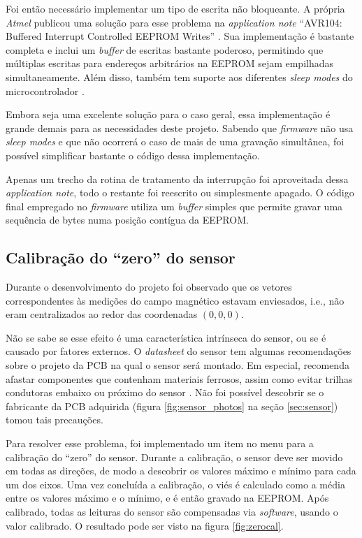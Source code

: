\documentclass[brazil,pagestart=firstchapter]{abnt}
\makeatletter
\newcommand*{\ie}{i.e.\@\xspace}
\makeatother
\begin{document}
Foi então necessário implementar um tipo de escrita não bloqueante.
A própria \textit{Atmel} publicou uma solução para esse problema na
\textit{application note} ``AVR104: Buffered Interrupt Controlled EEPROM
Writes'' \cite{AVR104}. Sua implementação é bastante completa e inclui um
\textit{buffer} de escritas bastante poderoso, permitindo que múltiplas
escritas para endereços arbitrários na \ac{EEPROM} sejam empilhadas
simultaneamente. Além disso, também tem suporte aos diferentes \textit{sleep
modes} do microcontrolador \cite{ATmega8}.

Embora seja uma excelente solução para o caso geral, essa implementação
é grande demais para as necessidades deste projeto.
Sabendo que \textit{firmware} não usa \textit{sleep modes} e que não
ocorrerá o caso de mais de uma gravação simultânea, foi possível simplificar
bastante o código dessa implementação.

Apenas um trecho da rotina de tratamento da interrupção foi aproveitada
dessa \textit{application note}, todo o restante foi reescrito ou
simplesmente apagado. O código final empregado no \textit{firmware} utiliza
um \textit{buffer} simples que permite gravar uma sequência de bytes numa
posição contígua da \ac{EEPROM}.


\subsection{Calibração do ``zero'' do sensor}
\label{sub:zerocal}

Durante o desenvolvimento do projeto foi observado que os vetores
correspondentes às medições do campo magnético estavam enviesados, \ie, não
eram centralizados ao redor das coordenadas $(0, 0, 0)$.

Não se sabe se esse efeito é uma característica intrínseca do sensor, ou se
é causado por fatores externos. O \textit{datasheet} do sensor tem algumas
recomendações sobre o projeto da \ac{PCB} na qual o sensor será montado. Em
especial, recomenda afastar componentes que contenham materiais ferrosos,
assim como evitar trilhas condutoras embaixo ou próximo do sensor
\cite{HMC5883L}. Não foi possível descobrir se o fabricante da \ac{PCB}
adquirida (figura \ref{fig:sensor_photos} na seção
\ref{sec:sensor}) tomou tais precauções.

Para resolver esse problema, foi implementado um item no menu para
a calibração do ``zero'' do sensor. Durante a calibração, o sensor deve ser
movido em todas as direções, de modo a descobrir os valores máximo e mínimo
para cada um dos eixos. Uma vez concluída a calibração, o viés é calculado
como a média entre os valores máximo e o mínimo, e é então gravado na
\ac{EEPROM}. Após calibrado, todas as leituras do sensor são compensadas via
\textit{software}, usando o valor calibrado. O resultado pode ser visto na
figura \ref{fig:zerocal}.
\end{document}
